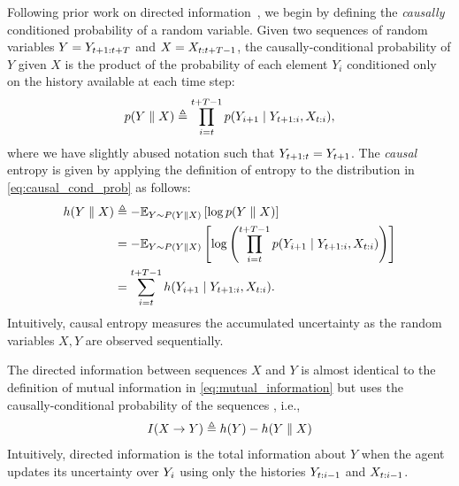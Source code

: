 Following prior work on directed information~\cite{kramer1998directed,massey1990causality},
we begin by defining the \textit{causally} conditioned probability of a random variable.
Given two sequences of random variables $Y = Y_{t+1:t+T}$ and $X = X_{t:t+T-1}$, 
the causally-conditional probability of $Y$ given $X$ is the product of the probability of each element $Y_i$ conditioned only on the history available at each time step:
\begin{equation}
    p(Y \parallel X) \triangleq \prod_{i=t}^{t+T-1} p(Y_{i+1} \mid Y_{t+1:i}, X_{t:i}),
\label{eq:causal_cond_prob}
\end{equation}
where we have slightly abused notation such that $Y_{t+1:t} = Y_{t+1}$. 
The \textit{causal} entropy \cite[Def. 3.1]{kramer1998directed} is given by applying the definition of entropy to the distribution in \eqref{eq:causal_cond_prob} as follows:
\begin{subequations}
\label{eq:causal_entropy}
    \begin{align}
    h(Y \parallel X) &\triangleq -\mathbb{E}_{Y \sim P(Y\parallel X)}\left[ \log p(Y \parallel X) \right] \\
    &= -\mathbb{E}_{Y \sim P(Y\parallel X)}\left[ \log \left( \prod_{i=t}^{t+T-1} p(Y_{i+1} \mid Y_{t+1:i}, X_{t:i}) \right) \right] \\
    &= \sum_{i=t}^{t+T-1} h(Y_{i+1} \mid Y_{t+1:i}, X_{t:i}).
    \end{align}
\end{subequations}
Intuitively, causal entropy measures the accumulated uncertainty as the random variables $X, Y$ are observed sequentially.

The directed information  between sequences $X$ and $Y$ is almost identical to the definition of mutual information in \eqref{eq:mutual_information} but uses the causally-conditional probability of the sequences \cite[Def. 3.5]{kramer1998directed}, i.e.,
\begin{equation}
\label{eq:directed_information}
    I(X \rightarrow Y) \triangleq h(Y) - h(Y \parallel X)
\end{equation}
Intuitively, directed information is the total information  about $Y$ when the agent updates its uncertainty over $Y_i$ using only the histories $Y_{t:i-1}$ and $X_{t:i-1}$. 

